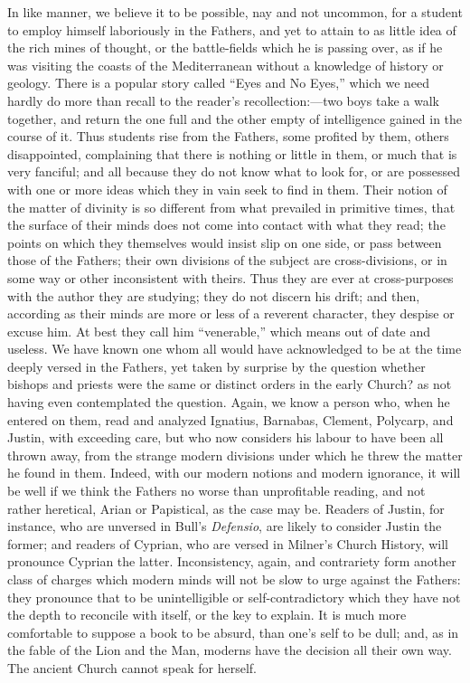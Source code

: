In like manner, we believe it to be possible, nay
and not uncommon, for a student to employ himself laboriously in the
Fathers, and yet to attain to as little idea of the rich mines of
thought, or the battle-fields which he is passing over, as if he was
visiting the coasts of the Mediterranean without a knowledge of
history or geology. There is a popular story called ``Eyes and No
Eyes,'' which we need hardly do more than recall to the reader's
recollection:—two boys take a walk together, and return the one full
and the other empty of intelligence gained in the course of it. Thus
students rise from the Fathers, some profited by them, others
disappointed, complaining that there is nothing or little in them, or
much that is very fanciful; and all because they do not know what to
look for, or are possessed with one or more ideas which they in vain
seek to find in them. Their notion of the matter of divinity is so
different from what prevailed in primitive times, that the surface of
their minds does not come into contact with what they read; the points
on which they themselves would insist slip on one side, or pass
between those of the Fathers; their own divisions of the subject are
cross-divisions, or in some way or other inconsistent with theirs.
Thus they are ever at cross-purposes with the author they are
studying; they do not discern his drift; and then, according as their
minds are more or less of a reverent character, they despise or excuse
him. At best they call him ``venerable,'' which means out of date and
useless. We have known one whom all would have acknowledged to be at
the time deeply versed in the Fathers, yet taken by surprise by the
question whether bishops and priests were the same or distinct orders
in the early Church? as not having even contemplated the question.
Again, we know a person who, when he entered on them, read and
analyzed Ignatius, Barnabas, Clement, Polycarp, and Justin, with
exceeding care, but who now considers his labour to have been all
thrown away, from the strange modern divisions under which he threw
the matter he found in them. Indeed, with our modern notions and
modern ignorance, it will be well if we think the Fathers no worse
than unprofitable reading, and not rather heretical, Arian or
Papistical, as the case may be. Readers of Justin, for instance, who
are unversed in Bull's \emph{Defensio}, are likely to consider Justin
the former; and readers of Cyprian, who are versed in Milner's Church
History, will pronounce Cyprian the latter. Inconsistency, again, and
contrariety form another class of charges which modern minds will not
be slow to urge against the Fathers: they pronounce that to be
unintelligible or self-contradictory which they have not the depth to
reconcile with itself, or the key to explain. It is much more
comfortable to suppose a book to be absurd, than one's self to be
dull; and, as in the fable of the Lion and the Man, moderns have the
decision all their own way. The ancient Church cannot speak for
herself.

